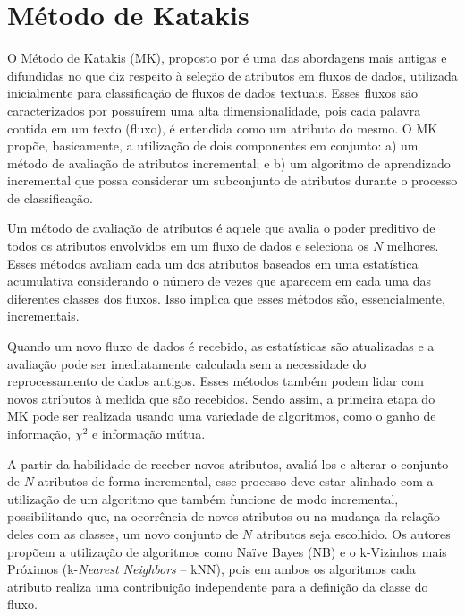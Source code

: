 \section{Método de Katakis}\label{sec:katakis} 

O Método de Katakis (MK), 
proposto por  é uma das abordagens mais antigas e difundidas no que diz respeito à seleção de atributos em fluxos de dados, utilizada inicialmente para classificação de fluxos de dados textuais. Esses fluxos são caracterizados por possuírem uma alta dimensionalidade, pois cada palavra contida em um texto (fluxo), é entendida como um atributo do mesmo. O MK propõe, basicamente, a utilização de dois componentes em conjunto: a) um método de avaliação de atributos incremental; e b) um algoritmo de aprendizado incremental que possa considerar um subconjunto de atributos durante o processo de classificação.

Um método de avaliação de atributos é aquele que avalia o poder preditivo de todos os atributos envolvidos em um fluxo de dados e seleciona os $N$ melhores. Esses métodos avaliam cada um dos atributos baseados em uma estatística acumulativa considerando o número de vezes que aparecem em cada uma das diferentes classes dos fluxos. Isso implica que esses métodos são, essencialmente, incrementais. 

Quando um novo fluxo de dados é recebido, as estatísticas são atualizadas e a avaliação pode ser imediatamente calculada sem a necessidade do reprocessamento de dados antigos. Esses métodos também podem lidar com novos atributos à medida que são recebidos. Sendo assim, a primeira etapa do MK pode ser realizada usando uma variedade de algoritmos, como o ganho de informação, $\chi^{2}$ e informação mútua.

A partir da habilidade de receber novos atributos, avaliá-los e alterar o conjunto de $N$ atributos de forma incremental, esse processo deve estar alinhado com a utilização de um algoritmo que também funcione de modo incremental, possibilitando que, na ocorrência de novos atributos ou na mudança da relação deles com as classes, um novo conjunto de $N$ atributos seja escolhido. Os autores propõem a utilização de algoritmos como Naïve
Bayes (NB) 
e o k-Vizinhos mais Próximos (k-\textit{Nearest Neighbors} -- kNN), 
pois em ambos os algoritmos cada atributo realiza uma contribuição independente para a definição da classe do fluxo.


